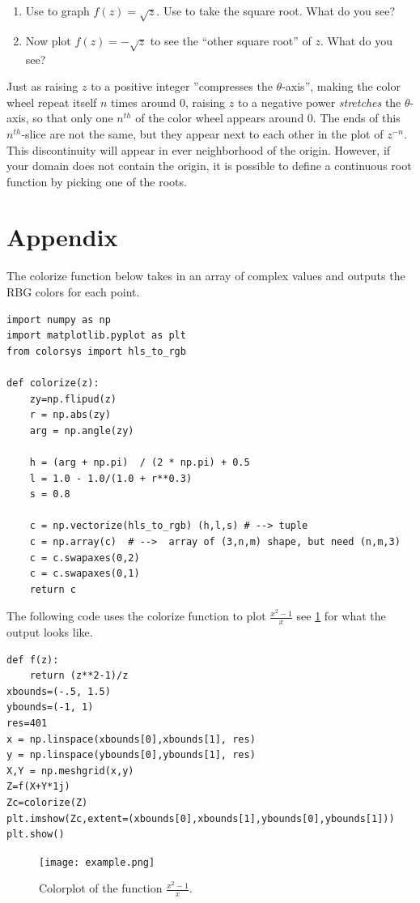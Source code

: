 \begin{problem}
\begin{enumerate}
\item Use  to graph $f(z) = \sqrt{z}$.
Use  to take the square root.
What do you see?
\item Now plot $f(z) = -\sqrt{z}$ to see the ``other square root'' of $z$. What do you see?
\end{enumerate}
\end{problem}

Just as raising $z$ to a positive integer ''compresses the $\theta$-axis'', making the color wheel repeat itself $n$ times around 0, raising $z$ to a negative power \emph{stretches} the $\theta$-axis, so that only one $n^{th}$ of the color wheel appears around 0.
The ends of this $n^{th}$-slice are not the same, but they appear next to each other in the plot of $z^{-n}$.
This discontinuity will appear in ever neighborhood of the origin. 
However, if your domain does not contain the origin, it is possible to define a continuous root function by picking one of the roots.


\section*{Appendix}
The colorize function below takes in an array of complex values and outputs the RBG colors for each point.

\begin{lstlisting}
import numpy as np
import matplotlib.pyplot as plt
from colorsys import hls_to_rgb

def colorize(z):
    zy=np.flipud(z)
    r = np.abs(zy)
    arg = np.angle(zy)

    h = (arg + np.pi)  / (2 * np.pi) + 0.5
    l = 1.0 - 1.0/(1.0 + r**0.3)
    s = 0.8

    c = np.vectorize(hls_to_rgb) (h,l,s) # --> tuple
    c = np.array(c)  # -->  array of (3,n,m) shape, but need (n,m,3)
    c = c.swapaxes(0,2)
    c = c.swapaxes(0,1)
    return c
\end{lstlisting}

The following code uses the colorize function to plot  $\frac{x^2 - 1}{x}$ see \ref{fig:example} for what the output looks like.

\begin{lstlisting}
def f(z):
	return (z**2-1)/z
xbounds=(-.5, 1.5)
ybounds=(-1, 1)
res=401
x = np.linspace(xbounds[0],xbounds[1], res)
y = np.linspace(ybounds[0],ybounds[1], res)
X,Y = np.meshgrid(x,y)
Z=f(X+Y*1j)
Zc=colorize(Z)
plt.imshow(Zc,extent=(xbounds[0],xbounds[1],ybounds[0],ybounds[1]))
plt.show()
\end{lstlisting}

\begin{figure}
\texttt{[image: example.png]}
\caption{Colorplot of the  function $\frac{x^2 - 1}{x}$.}
\label{fig:example}
\end{figure}

